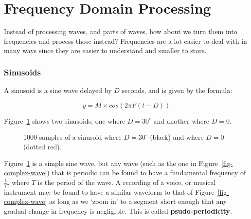 \section{Frequency Domain Processing}

Instead of processing waves, and parts of waves, how about we turn them into
frequencies and process those instead? Frequencies are a lot easier to deal with
in many ways since they are easier to understand and smaller to store.

\subsubsection{Sinusoids}

A sinusoid is a sine wave delayed by $D$ seconds, and is given by the formula:

\[
  y = M \times cos(2\pi F (t - D))
\]

Figure~\ref{fig-sinusoid} shows two sinusoids; one where $D = 30^{\circ}$ and
another where $D = 0$.

\begin{figure}
  \centering
  \caption{1000 samples of a sinusoid where $D = 30^{\circ}$ (black) and where
  $D = 0$ (dotted red).}
  \label{fig-sinusoid}
\end{figure} 

Figure~\ref{fig-sinusoid} is a simple sine wave, but any wave (such as the one
in Figure~\ref{fig-complex-wave}) that is periodic can be found to have a
fundamental frequency of $\frac{1}{T}$, where $T$ is the period of the wave. A
recording of a voice, or musical instrument may be found to have a similar
waveform to that of Figure~\ref{fig-complex-wave} as long as we `zoom in' to a
segment short enough that any gradual change in frequency is negligible. This is
called \textbf{psudo-periodicity}.

